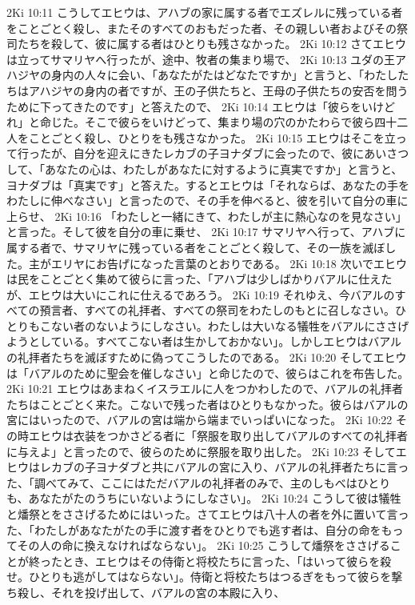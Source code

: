 2Ki 10:11  こうしてエヒウは、アハブの家に属する者でエズレルに残っている者をことごとく殺し、またそのすべてのおもだった者、その親しい者およびその祭司たちを殺して、彼に属する者はひとりも残さなかった。
2Ki 10:12  さてエヒウは立ってサマリヤへ行ったが、途中、牧者の集まり場で、
2Ki 10:13  ユダの王アハジヤの身内の人々に会い、「あなたがたはどなたですか」と言うと、「わたしたちはアハジヤの身内の者ですが、王の子供たちと、王母の子供たちの安否を問うために下ってきたのです」と答えたので、
2Ki 10:14  エヒウは「彼らをいけどれ」と命じた。そこで彼らをいけどって、集まり場の穴のかたわらで彼ら四十二人をことごとく殺し、ひとりをも残さなかった。
2Ki 10:15  エヒウはそこを立って行ったが、自分を迎えにきたレカブの子ヨナダブに会ったので、彼にあいさつして、「あなたの心は、わたしがあなたに対するように真実ですか」と言うと、ヨナダブは「真実です」と答えた。するとエヒウは「それならば、あなたの手をわたしに伸べなさい」と言ったので、その手を伸べると、彼を引いて自分の車に上らせ、
2Ki 10:16  「わたしと一緒にきて、わたしが主に熱心なのを見なさい」と言った。そして彼を自分の車に乗せ、
2Ki 10:17  サマリヤへ行って、アハブに属する者で、サマリヤに残っている者をことごとく殺して、その一族を滅ぼした。主がエリヤにお告げになった言葉のとおりである。
2Ki 10:18  次いでエヒウは民をことごとく集めて彼らに言った、「アハブは少しばかりバアルに仕えたが、エヒウは大いにこれに仕えるであろう。
2Ki 10:19  それゆえ、今バアルのすべての預言者、すべての礼拝者、すべての祭司をわたしのもとに召しなさい。ひとりもこない者のないようにしなさい。わたしは大いなる犠牲をバアルにささげようとしている。すべてこない者は生かしておかない」。しかしエヒウはバアルの礼拝者たちを滅ぼすために偽ってこうしたのである。
2Ki 10:20  そしてエヒウは「バアルのために聖会を催しなさい」と命じたので、彼らはこれを布告した。
2Ki 10:21  エヒウはあまねくイスラエルに人をつかわしたので、バアルの礼拝者たちはことごとく来た。こないで残った者はひとりもなかった。彼らはバアルの宮にはいったので、バアルの宮は端から端までいっぱいになった。
2Ki 10:22  その時エヒウは衣装をつかさどる者に「祭服を取り出してバアルのすべての礼拝者に与えよ」と言ったので、彼らのために祭服を取り出した。
2Ki 10:23  そしてエヒウはレカブの子ヨナダブと共にバアルの宮に入り、バアルの礼拝者たちに言った、「調べてみて、ここにはただバアルの礼拝者のみで、主のしもべはひとりも、あなたがたのうちにいないようにしなさい」。
2Ki 10:24  こうして彼は犠牲と燔祭とをささげるためにはいった。さてエヒウは八十人の者を外に置いて言った、「わたしがあなたがたの手に渡す者をひとりでも逃す者は、自分の命をもってその人の命に換えなければならない」。
2Ki 10:25  こうして燔祭をささげることが終ったとき、エヒウはその侍衛と将校たちに言った、「はいって彼らを殺せ。ひとりも逃がしてはならない」。侍衛と将校たちはつるぎをもって彼らを撃ち殺し、それを投げ出して、バアルの宮の本殿に入り、
